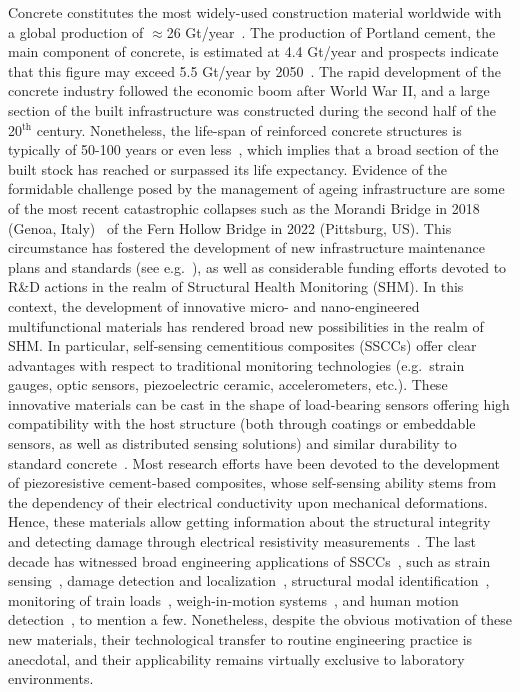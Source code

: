\documentclass[a4paper,fleqn]{cas-sc}
\begin{document}
Concrete constitutes the most widely-used construction material worldwide with a global production of $\approx$26 Gt/year~\cite{Monteiro2017}. The production of Portland cement, the main component of concrete, is estimated at 4.4 Gt/year and prospects indicate that this figure may exceed 5.5 Gt/year by 2050~\cite{lehne2018making}. The rapid development of the concrete industry followed the economic boom after World War II, and a large section of the built infrastructure was constructed during the second half of the 20$^{\textrm{th}}$ century. Nonetheless, the life-span of reinforced concrete structures is typically of 50-100 years or even less~\cite{Truong2022}, which implies that a broad section of the built stock has reached or surpassed its life expectancy. Evidence of the formidable challenge posed by the management of ageing infrastructure are some of the most recent catastrophic collapses such as the Morandi Bridge in 2018 (Genoa, Italy)~\cite{Calvi2019} of the Fern Hollow Bridge in 2022 (Pittsburg, US). This circumstance has fostered the development of new infrastructure maintenance plans and standards (see e.g.~\cite{Commission2019,GUIDA2020}), as well as considerable funding efforts devoted to R\&D actions in the realm of Structural Health Monitoring (SHM). In this context, the development of innovative micro- and nano-engineered multifunctional materials has rendered broad new possibilities in the realm of SHM. In particular, self-sensing cementitious composites (SSCCs) offer clear advantages with respect to traditional monitoring technologies (e.g.~strain gauges, optic sensors, piezoelectric ceramic, accelerometers, etc.). These innovative materials can be cast in the shape of load-bearing sensors offering high compatibility with the host structure (both through coatings or embeddable sensors, as well as distributed sensing solutions) and similar durability to standard concrete~\cite{Teomete2013, Ferreira2016, mendoza2018reinforcing}. Most research efforts have been devoted to the development of piezoresistive cement-based composites, whose self-sensing ability stems from the dependency of their electrical conductivity upon mechanical deformations. Hence, these materials allow getting information about the structural integrity and detecting damage through electrical resistivity measurements~\cite{li2019multifunctional}. The last decade has witnessed broad engineering applications of SSCCs~\cite{Han2015a}, such as strain sensing~\cite{Galao2014}, damage detection and localization~\cite{Downey2017}, structural modal identification~\cite{Ding2020}, monitoring of train loads~\cite{Ding2022}, weigh-in-motion systems~\cite{birgin2023self}, and human motion detection~\cite{DONG2022129130}, to mention a few. Nonetheless, despite the obvious motivation of these new materials, their technological transfer to routine engineering practice is anecdotal, and their applicability remains virtually exclusive to laboratory environments.
\end{document}
